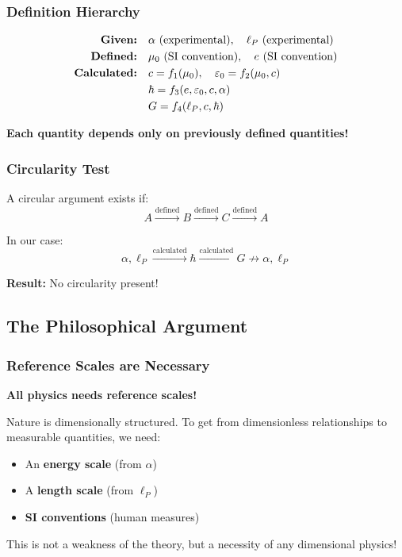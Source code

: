 \documentclass[12pt,a4paper]{article}
\theoremstyle{definition}
\begin{document}
	\subsubsection{Definition Hierarchy}
	
	\begin{align}
		\text{\textbf{Given:}} &\quad \alpha \text{ (experimental)}, \quad \ell_P \text{ (experimental)}\\
		\text{\textbf{Defined:}} &\quad \mu_0 \text{ (SI convention)}, \quad e \text{ (SI convention)}\\
		\text{\textbf{Calculated:}} &\quad c = f_1(\mu_0), \quad \varepsilon_0 = f_2(\mu_0, c)\\
		&\quad \hbar = f_3(e, \varepsilon_0, c, \alpha)\\
		&\quad G = f_4(\ell_P, c, \hbar)
	\end{align}
	
	\textbf{Each quantity depends only on previously defined quantities!}
	
	\subsubsection{Circularity Test}
	
	A circular argument exists if:
	\begin{equation}
		A \xrightarrow{\text{defined}} B \xrightarrow{\text{defined}} C \xrightarrow{\text{defined}} A
	\end{equation}
	
	In our case:
	\begin{equation}
		\alpha, \ell_P \xrightarrow{\text{calculated}} \hbar \xrightarrow{\text{calculated}} G \not\rightarrow \alpha, \ell_P
	\end{equation}
	
	\textbf{Result:} No circularity present!
	
	\subsection{The Philosophical Argument}
	
	\subsubsection{Reference Scales are Necessary}
	
	\begin{tcolorbox}[colback=blue!5!white,colframe=blue!75!black,title=Fundamental Insight]
		\textbf{All physics needs reference scales!}
		
		Nature is dimensionally structured. To get from dimensionless relationships to measurable quantities, we need:
		\begin{itemize}
			\item An \textbf{energy scale} (from $\alpha$)
			\item A \textbf{length scale} (from $\ell_P$) 
			\item \textbf{SI conventions} (human measures)
		\end{itemize}
		
		This is not a weakness of the theory, but a necessity of any dimensional physics!
	\end{tcolorbox}
	
\end{document}
